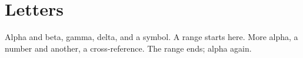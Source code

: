 \documentclass{article}
\begin{document}
\section{Letters}
Alpha and beta, gamma,
delta, and a symbol.
A range starts here.
\newpage
More alpha, a number and another,
a cross-reference.
\newpage
The range ends; alpha again.
\printindex
\end{document}
